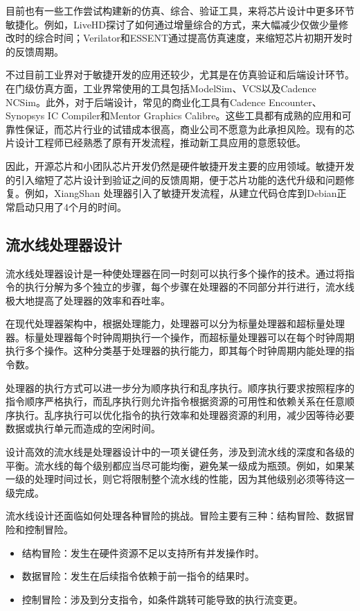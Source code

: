 目前也有一些工作尝试构建新的仿真、综合、验证工具，来将芯片设计中更多环节敏捷化。例如，LiveHD\cite{wangLiveHDProductiveLive2020a}探讨了如何通过增量综合的方式，来大幅减少仅做少量修改时的综合时间；Verilator和ESSENT通过提高仿真速度\cite{beamerCaseAcceleratingSoftware2020}，来缩短芯片初期开发时的反馈周期。

不过目前工业界对于敏捷开发的应用还较少，尤其是在仿真验证和后端设计环节。在门级仿真方面，工业界常使用的工具包括ModelSim、VCS以及Cadence NCSim。此外，对于后端设计，常见的商业化工具有Cadence Encounter、Synopsys IC Compiler和Mentor Graphics Calibre。这些工具都有成熟的应用和可靠性保证，而芯片行业的试错成本很高，商业公司不愿意为此承担风险。现有的芯片设计工程师已经熟悉了原有开发流程，推动新工具应用的意愿较低。

因此，开源芯片和小团队芯片开发仍然是硬件敏捷开发主要的应用领域。敏捷开发的引入缩短了芯片设计到验证之间的反馈周期，便于芯片功能的迭代升级和问题修复。例如，XiangShan\cite{xuDevelopingHighPerformance2022} 处理器引入了敏捷开发流程，从建立代码仓库到Debian正常启动只用了4个月的时间。

\subsection{流水线处理器设计}

流水线处理器设计是一种使处理器在同一时刻可以执行多个操作的技术。通过将指令的执行分解为多个独立的步骤，每个步骤在处理器的不同部分并行进行，流水线极大地提高了处理器的效率和吞吐率。

在现代处理器架构中，根据处理能力，处理器可以分为标量处理器和超标量处理器。标量处理器每个时钟周期执行一个操作，而超标量处理器可以在每个时钟周期执行多个操作。这种分类基于处理器的执行能力，即其每个时钟周期内能处理的指令数。

处理器的执行方式可以进一步分为顺序执行和乱序执行。顺序执行要求按照程序的指令顺序严格执行，而乱序执行则允许指令根据资源的可用性和依赖关系在任意顺序执行。乱序执行可以优化指令的执行效率和处理器资源的利用，减少因等待必要数据或执行单元而造成的空闲时间。

设计高效的流水线是处理器设计中的一项关键任务，涉及到流水线的深度和各级的平衡。流水线的每个级别都应当尽可能均衡，避免某一级成为瓶颈。例如，如果某一级的处理时间过长，则它将限制整个流水线的性能，因为其他级别必须等待这一级完成。

流水线设计还面临如何处理各种冒险的挑战。冒险主要有三种：结构冒险、数据冒险和控制冒险。
\begin{itemize}
    \item 结构冒险：发生在硬件资源不足以支持所有并发操作时。
    \item 数据冒险：发生在后续指令依赖于前一指令的结果时。
    \item 控制冒险：涉及到分支指令，如条件跳转可能导致的执行流变更。
\end{itemize}

